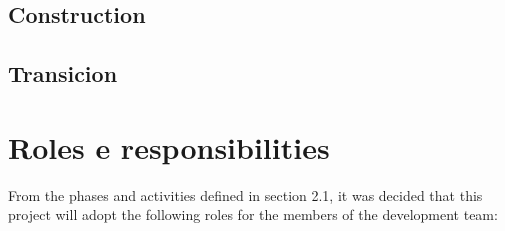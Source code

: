 \documentclass[11pt, twoside, a4paper]{book}
\begin{document}
        			\subsection{Construction}
        			
        			\subsection{Transicion}
        	
        	\section{Roles e responsibilities}
        	
				From the phases and activities defined in section 2.1, it was decided that this project will adopt the following roles for the members of the development team:
        		
\end{document}
